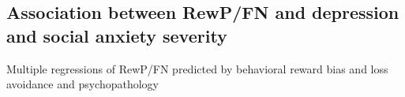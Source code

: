 \documentclass[english,man,floatsintext]{apa6}
\begin{document}
\hypertarget{association-between-rewpfn-and-depression-and-social-anxiety-severity}{%
\subsection{Association between RewP/FN and depression and social anxiety severity}\label{association-between-rewpfn-and-depression-and-social-anxiety-severity}}

\begin{table}[tbp]

\begin{center}
\begin{threeparttable}

\caption{\label{tab:unnamed-chunk-5}Multiple regressions of RewP/FN predicted by behavioral reward bias and loss avoidance and psychopathology}


\end{threeparttable}
\end{center}
\end{table}
\end{document}
